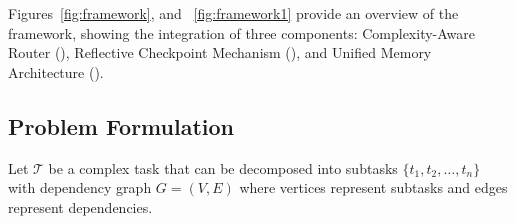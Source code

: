 \documentclass{article}
\theoremstyle{plain}
\theoremstyle{definition}
\theoremstyle{remark}
\begin{document}
Figures~\ref{fig:framework}, and ~\ref{fig:framework1} provide an overview of the framework, showing the integration of three components: Complexity-Aware Router (\car{}), Reflective Checkpoint Mechanism (\rcm{}), and Unified Memory Architecture (\uma{}). 
%		
%		
%		

\subsection{Problem Formulation}
\label{sec:formulation}

Let $\mathcal{T}$ be a complex task that can be decomposed into subtasks $\{t_1, t_2, \ldots, t_n\}$ with dependency graph $G = (V, E)$ where vertices represent subtasks and edges represent dependencies.
\end{document}
